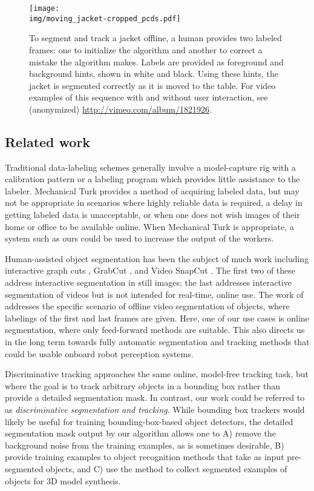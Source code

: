 \documentclass[conference]{IEEEtran}
\newcommand{\img}{img}
\begin{document}
\begin{figure}
  \centering
  \texttt{[image: \\img/moving\_jacket-cropped\_pcds.pdf]}
  \caption{To segment and track a jacket offline, a human provides two labeled frames: one to initialize the algorithm and another to correct a mistake the algorithm makes.  Labels are provided as foreground and background hints, shown in white and black.  Using these hints, the jacket is segmented correctly as it is moved to the table.  For video examples of this sequence with and without user interaction, see (anonymized) \href{http://vimeo.com/album/1821926}{http://vimeo.com/album/1821926}.}
  \label{fig:jacket}
\end{figure}


\subsection{Related work}


Traditional data-labeling schemes generally involve a model-capture rig with a calibration pattern or a labeling program which provides little assistance to the labeler.  Mechanical Turk provides a method of acquiring labeled data, but may not be appropriate in scenarios where highly reliable data is required, a delay in getting labeled data is unacceptable, or when one does not wish images of their home or office to be available online.  When Mechanical Turk is appropriate, a system such as ours could be used to increase the output of the workers.

Human-assisted object segmentation has been the subject of much work including interactive graph cuts \cite{boykov2001a}, GrabCut \cite{rother2004a}, and Video SnapCut \cite{bai2009a}.  The first two of these address interactive segmentation in still images; the last addresses interactive segmentation of videos but is not intended for real-time, online use. The work of \citet{budvytis2011a} addresses the specific scenario of offline video segmentation of objects, where labelings of the first and last frames are given. Here, one of our use cases is online segmentation, where only feed-forward methods are suitable.  This also directs us in the long term towards fully automatic segmentation and tracking methods that could be usable onboard robot perception systems.

Discriminative tracking \cite{grabner2006a, stalder2009a, kalal2010a} approaches the same online, model-free tracking task, but where the goal is to track arbitrary objects in a bounding box rather than provide a detailed segmentation mask.  In contrast, our work could be referred to as \emph{discriminative segmentation and tracking}.  While bounding box trackers would likely be useful for training bounding-box-based object detectors, the detailed segmentation mask output by our algorithm allows one to A) remove the background noise from the training examples, as is sometimes desirable, B) provide training examples to object recognition methods that take as input pre-segmented objects, and C) use the method to collect segmented examples of objects for 3D model synthesis.
\end{document}
